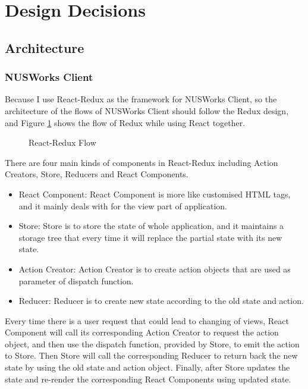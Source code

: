 \documentclass[fyp]{socreport}
\begin{document}
\section{Design Decisions}
\subsection{Architecture}
\subsubsection{NUSWorks Client}
Because I use React-Redux as the framework for NUSWorks Client, so the architecture of the flows of NUSWorks Client should follow the Redux design, and Figure {\ref{redux}} shows the flow of Redux while using React together.

\begin{figure}
\caption{React-Redux Flow}
\label{redux}
\end{figure}

There are four main kinds of components in React-Redux including Action Creators, Store, Reducers and React Components.

\begin{itemize}
	\item React Component: React Component is more like customised HTML tags, and it mainly deals with for the view part of application.
	\item Store: Store is to store the state of whole application, and it maintains a storage tree that every time it will replace the partial state with its new state.
	\item Action Creator: Action Creator is to create action objects that are used as parameter of dispatch function.
	\item Reducer: Reducer is to create new state according to the old state and action.
\end{itemize}

Every time there is a user request that could lead to changing of views, React Component will call its corresponding Action Creator to request the action object, and then use the dispatch function, provided by Store, to emit the action to Store. Then Store will call the corresponding Reducer to return back the new state by using the old state and action object. Finally, after Store updates the state and re-render the corresponding React Components using updated state.
\end{document}
